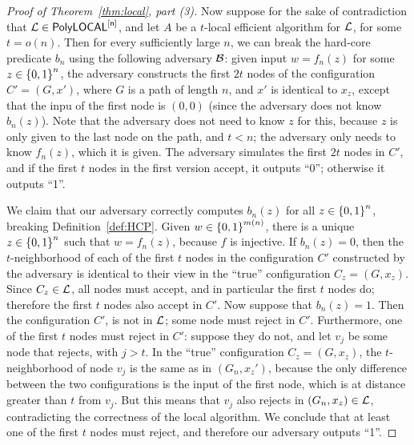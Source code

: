 \begin{proof}[Proof of Theorem~\ref{thm:local}, part (3)]
	Now suppose for the sake of contradiction that $\mathcal{L} \in \mathsf{PolyLOCAL}^{[\mathsf{n}]}$,
	and let $A$ be a $t$-local efficient algorithm for $\mathcal{L}$, for some $t = o(n)$.
	Then for every sufficiently large $n$, 
	we can break the hard-core predicate $b_n$ using the following adversary $\mathcal{B}$:
	given input $w = f_n(z)$ for some $z \in \left \{{0,1} \right \}^n$,
	the adversary constructs the first $2t$ nodes of the configuration $C' = (G, x')$,
	where $G$ is a path of length $n$,
	and $x'$ is identical to $x_z$,
	except that the inpu of the first node is $(0, 0)$ (since the adversary does not know $b_n(z)$).
	Note that the adversary does not need to know $z$ for this, because $z$ is only given to the last node
	on the path, and $t < n$; the adversary only needs to know $f_n(z)$, which it is given.
	The adversary simulates the first $2t$ nodes in $C'$,
	and
	if the first $t$ nodes in the first version accept, it outputs ``0'';
	otherwise it outputs ``1''.

	We claim that our adversary correctly computes $b_n(z)$ for all $z \in \left \{{0,1} \right \}^n$,
	breaking Definition~\ref{def:HCP}.
	Given $w \in \left \{{0,1} \right \}^{m(n)}$, there is a unique $z \in \left \{{0,1} \right \}^n$ such that $w = f_n(z)$, because $f$ is injective.
	If $b_n(z) = 0$,
	then the $t$-neighborhood
	of each of the first $t$ nodes in the configuration $C'$ constructed by the adversary is identical
	to their view in the ``true'' configuration $C_z = (G, x_z)$.
	Since $C_z \in \mathcal{L}$, all nodes must accept, and in particular the first $t$ nodes do;
	therefore the first $t$ nodes also accept in $C'$.
	Now suppose that $b_n(z) = 1$.
	Then the configuration $C'$,
	is not in $\mathcal{L}$; some node must reject in $C'$.
	Furthermore, one of the first $t$ nodes must reject in $C'$:
	suppose they do not, and let $v_j$ be some node that rejects, with $j > t$.
	In the ``true'' configuration $C_z = (G, x_z)$, the $t$-neighborhood of node $v_j$
	is the same as in $(G_n, x_z')$, because the only difference between the two configurations is the input
	of the first node, which is at distance greater than $t$ from $v_j$.
	But this means that $v_j$ also rejects in $(G_n, x_z) \in \mathcal{L}$, contradicting the correctness of the local algorithm.
	We conclude that at least one of the first $t$ nodes must reject, and therefore our adversary outputs ``1''.
\end{proof}
